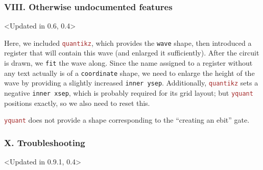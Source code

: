 \documentclass{scrartcl}
\makeatletter
\newenvironment{codeexample*}{%
   \VerbatimEnvironment%
   \let\FVB@VerbatimOut\minted@FVB@VerbatimOut
   \let\FVE@VerbatimOut\minted@FVE@VerbatimOut
   \minted@configlang{tex}%
   \minted@fvset
   \begin{VerbatimOut}[codes={\catcode`\^^I=12},firstline,lastline]{\minted@jobname.pyg}%
}{
   \end{VerbatimOut}%
   \minted@langlinenoson%
   \begin{adjustbox}{center}
       \minted@jobname.pyg %
   \end{adjustbox}\nopagebreak
   \expandafter\minted@pygmentize\expandafter{\minted@lang}%
   \minted@langlinenosoff%
   \par%
}
\def\pkg#1{\textcolor{brown}{\texttt{#1}}}
\def\Yquant{\pkg{yquant}}
\makeatother
\begin{document}
         \subsubsection{VIII. Otherwise undocumented features}
            \begin{example}<Updated in 0.6, 0.4>
               \begin{codeexample*}
               \end{codeexample*}
               Here, we included \pkg{quantikz}, which provides the \texttt{wave} shape, then introduced a register that will contain this wave (and enlarged it sufficiently).
               After the circuit is drawn, we \texttt{fit} the wave along.
               Since the name assigned to a register without any text actually is of a \texttt{coordinate} shape, we need to enlarge the height of the wave by providing a slightly increased \texttt{inner ysep}.
               Additionally, \pkg{quantikz} sets a negative \texttt{inner xsep}, which is probably required for its grid layout; but \Yquant{} positions exactly, so we also need to reset this.
            \end{example}

            \Yquant{} does not provide a shape corresponding to the ``creating an ebit'' gate.

         \clearpage
         \subsubsection{X. Troubleshooting}
            \begin{example}<Updated in 0.9.1, 0.4>
               \begin{codeexample*}
               \end{codeexample*}
            \end{example}
      \endgroup
\end{document}
